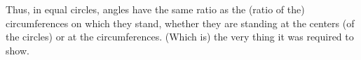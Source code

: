 \begin{Parallel}{}{}
{Thus, in equal circles,  angles have the same ratio
as the (ratio of the) circumferences on which they stand, whether they are standing at
the centers (of the circles) or at the circumferences. (Which is) the very thing it was required to show.}
\end{Parallel}


\vspace{7pt}{\footnotesize\noindent$^\dag$ This is a straight-forward generalization of Prop.~3.27}
